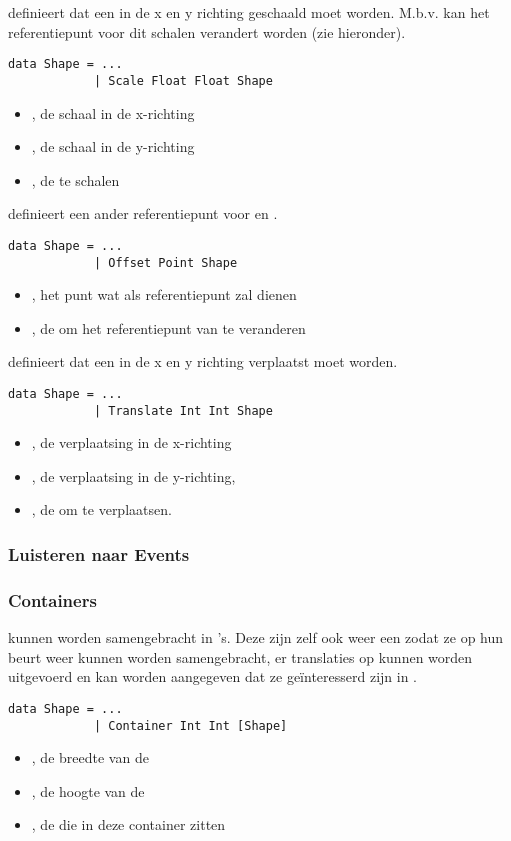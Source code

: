  definieert dat een \shape in de x en y richting geschaald moet worden. M.b.v.  kan het referentiepunt voor dit schalen verandert worden (zie hieronder).
\begin{lstlisting}
data Shape = ...
			| Scale Float Float Shape
\end{lstlisting}
\begin{itemize}
	\item {}, de schaal in de x-richting
	\item {}, de schaal in de y-richting
	\item {}, de te schalen \shape
\end{itemize}

 definieert een ander referentiepunt voor  en .
\begin{lstlisting}
data Shape = ...
			| Offset Point Shape
\end{lstlisting}
\begin{itemize}
	\item {}, het punt wat als referentiepunt zal dienen
	\item {}, de \shape om het referentiepunt van te veranderen
\end{itemize}

 definieert dat een \shape in de x en y richting verplaatst moet worden.
\begin{lstlisting}
data Shape = ...
			| Translate Int Int Shape
\end{lstlisting}
\begin{itemize}
	\item {}, de verplaatsing in de x-richting
	\item {}, de verplaatsing in de y-richting,
	\item {}, de \shape om te verplaatsen. 
\end{itemize}

\subsubsection{Luisteren naar Events}

\subsubsection{Containers}
\shapes kunnen worden samengebracht in 's. Deze zijn zelf ook weer een \shape zodat ze op hun beurt weer kunnen worden samengebracht, er translaties op kunnen worden uitgevoerd en kan worden aangegeven dat ze geïnteresserd zijn in \events. 
\begin{lstlisting}
data Shape = ...
			| Container Int Int [Shape]
\end{lstlisting}
\begin{itemize}
	\item {}, de breedte van de 
	\item {}, de hoogte van de 
	\item \type{[Shape]}, de \shapes die in deze container zitten
\end{itemize}

